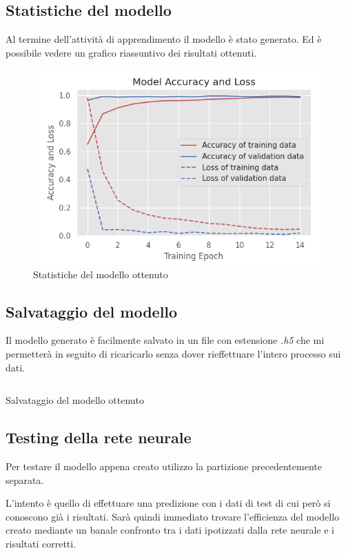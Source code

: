 \newpage
\subsection{Statistiche del modello}
Al termine dell'attività di apprendimento il modello è stato generato. Ed è possibile vedere un grafico 
riassuntivo dei risultati ottenuti.
\begin{figure}[H]
    \centering
    \includegraphics[scale = 0.60]{assets/images/classifications/accelerometer/right_hand/model-right-hand-acc.png}
    \caption{Statistiche del modello ottenuto}
\end{figure}


\subsection{Salvataggio del modello}
Il modello generato è facilmente salvato in un file con estensione \textit{.h5} che mi permetterà in seguito 
di ricaricarlo senza dover rieffettuare l'intero processo sui dati.
\begin{listing}[H] 
    \inputminted[frame=single,framesep=10pt]{python}{assets/snippets/classifier/save_model.py}
    \caption{Salvataggio del modello ottenuto}
\end{listing}


\subsection{Testing della rete neurale}
Per testare il modello appena creato utilizzo la partizione precedentemente separata.

L'intento è quello di effettuare una predizione con i dati di test di cui però si conoscono già i risultati. 
Sarà quindi immediato trovare l'efficienza del modello creato mediante un banale confronto tra i dati ipotizzati 
dalla rete neurale e i risultati corretti.

